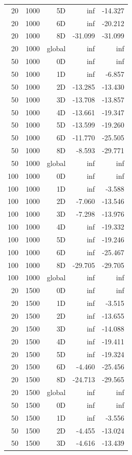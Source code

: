 \begin{longtable}{rrrrr}
20 & 1000 & 5D & inf & -14.327 \\
20 & 1000 & 6D & inf & -20.212 \\
20 & 1000 & 8D & -31.099 & -31.099 \\
20 & 1000 & global & inf & inf \\
50 & 1000 & 0D & inf & inf \\
50 & 1000 & 1D & inf & -6.857 \\
50 & 1000 & 2D & -13.285 & -13.430 \\
50 & 1000 & 3D & -13.708 & -13.857 \\
50 & 1000 & 4D & -13.661 & -19.347 \\
50 & 1000 & 5D & -13.599 & -19.260 \\
50 & 1000 & 6D & -11.770 & -25.505 \\
50 & 1000 & 8D & -8.593 & -29.771 \\
50 & 1000 & global & inf & inf \\
100 & 1000 & 0D & inf & inf \\
100 & 1000 & 1D & inf & -3.588 \\
100 & 1000 & 2D & -7.060 & -13.546 \\
100 & 1000 & 3D & -7.298 & -13.976 \\
100 & 1000 & 4D & inf & -19.332 \\
100 & 1000 & 5D & inf & -19.246 \\
100 & 1000 & 6D & inf & -25.467 \\
100 & 1000 & 8D & -29.705 & -29.705 \\
100 & 1000 & global & inf & inf \\
20 & 1500 & 0D & inf & inf \\
20 & 1500 & 1D & inf & -3.515 \\
20 & 1500 & 2D & inf & -13.655 \\
20 & 1500 & 3D & inf & -14.088 \\
20 & 1500 & 4D & inf & -19.411 \\
20 & 1500 & 5D & inf & -19.324 \\
20 & 1500 & 6D & -4.460 & -25.456 \\
20 & 1500 & 8D & -24.713 & -29.565 \\
20 & 1500 & global & inf & inf \\
50 & 1500 & 0D & inf & inf \\
50 & 1500 & 1D & inf & -3.556 \\
50 & 1500 & 2D & -4.455 & -13.024 \\
50 & 1500 & 3D & -4.616 & -13.439 \\

\end{longtable}
